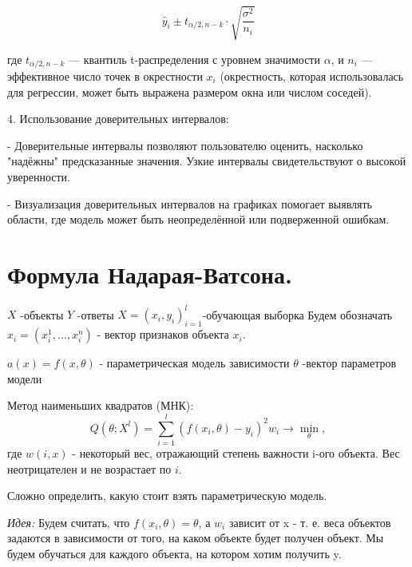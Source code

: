      \[
     \hat{y}_i \pm t_{\alpha/2, n-k} \cdot \sqrt{\frac{\sigma^2}{n_i}}
     \]

   где \( t_{\alpha/2, n-k} \) — квантиль t-распределения с уровнем значимости \(\alpha\), и \(n_i\) — эффективное число точек в окрестности \(x_i\) (окрестность, которая использовалась для регрессии, может быть выражена размером окна или числом соседей).

4. Использование доверительных интервалов:

   - Доверительные интервалы позволяют пользователю оценить, насколько "надёжны" предсказанные значения. Узкие интервалы свидетельствуют о высокой уверенности.

   - Визуализация доверительных интервалов на графиках помогает выявлять области, где модель может быть неопределённой или подверженной ошибкам.

\section{Формула Надарая-Ватсона.}
 $X$ -объекты
 $Y$ -ответы
 $X = (x_i, y_i)^l_{i=1}$-обучающая выборка
Будем обозначать $x_i = (x_i^1, ..., x_i^n)$ - вектор признаков объекта $x_i$.

$a(x)= f(x,\theta)$ - параметрическая модель зависимости
$\theta$ -вектор параметров модели

Метод наименьших квадратов (МНК):
\begin{equation*}
    \displaystyle Q(\theta; X^l) =  \sum\limits_{i=1}^l(f(x_i, \theta)-y_i)^2w_i \longrightarrow \min_\theta,
\end{equation*}
где $w(i,x)$ - некоторый вес, отражающий степень важности i-ого объекта. Вес неотрицателен и не возрастает по $i$.


Сложно определить, какую стоит взять параметрическую модель.

\textit{Идея:}
Будем считать, что $f(x_i, \theta)=\theta$,  а $w_i$ зависит от x - т. е. веса объектов задаются в зависимости от того, на каком объекте будет получен объект.
Мы будем обучаться для каждого объекта, на котором хотим получить y.

